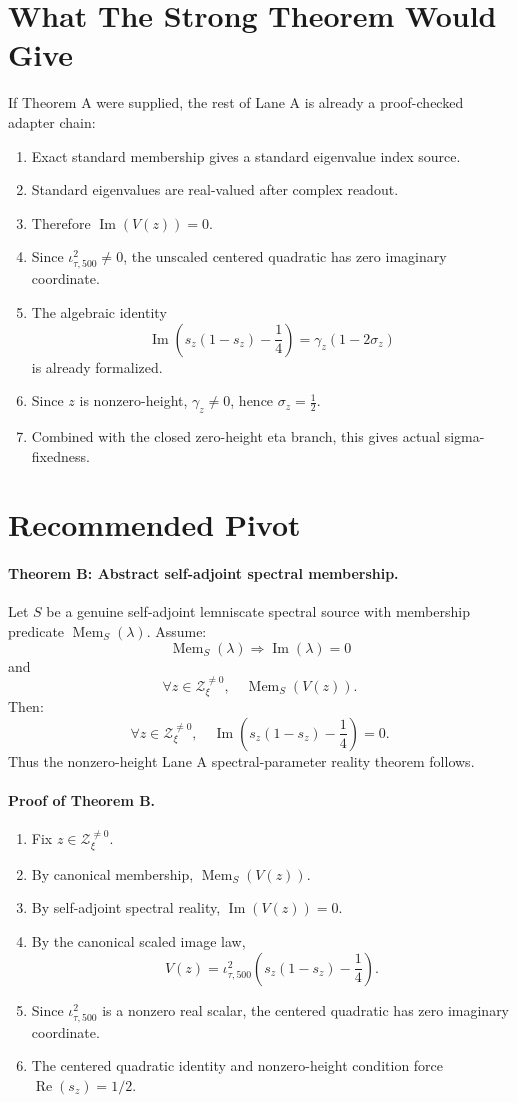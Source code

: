 \documentclass[11pt]{article}
\newcommand{\im}{\operatorname{Im}}
\newcommand{\re}{\operatorname{Re}}
\begin{document}
\section*{What The Strong Theorem Would Give}

If Theorem A were supplied, the rest of Lane A is already a proof-checked
adapter chain:
\begin{enumerate}
\item Exact standard membership gives a standard eigenvalue index source.
\item Standard eigenvalues are real-valued after complex readout.
\item Therefore \(\im(V(z))=0\).
\item Since \(\iota_{\tau,500}^2\neq0\), the unscaled centered quadratic has
  zero imaginary coordinate.
\item The algebraic identity
  \[
    \im\left(s_z(1-s_z)-\frac14\right)
    =
    \gamma_z(1-2\sigma_z)
  \]
  is already formalized.
\item Since \(z\) is nonzero-height, \(\gamma_z\neq0\), hence
  \(\sigma_z=\frac12\).
\item Combined with the closed zero-height eta branch, this gives actual
  sigma-fixedness.
\end{enumerate}

\section*{Recommended Pivot}

\paragraph{Theorem B: Abstract self-adjoint spectral membership.}
Let \(S\) be a genuine self-adjoint lemniscate spectral source with membership
predicate \(\operatorname{Mem}_S(\lambda)\).  Assume:
\[
  \operatorname{Mem}_S(\lambda)\Longrightarrow \im(\lambda)=0
\]
and
\[
  \forall z\in\mathcal Z_\xi^{\neq0},\quad \operatorname{Mem}_S(V(z)).
\]
Then:
\[
  \forall z\in\mathcal Z_\xi^{\neq0},\quad
  \im\left(s_z(1-s_z)-\frac14\right)=0.
\]
Thus the nonzero-height Lane A spectral-parameter reality theorem follows.

\paragraph{Proof of Theorem B.}
\begin{enumerate}
\item Fix \(z\in\mathcal Z_\xi^{\neq0}\).
\item By canonical membership, \(\operatorname{Mem}_S(V(z))\).
\item By self-adjoint spectral reality, \(\im(V(z))=0\).
\item By the canonical scaled image law,
  \[
    V(z)=\iota_{\tau,500}^2
    \left(s_z(1-s_z)-\frac14\right).
  \]
\item Since \(\iota_{\tau,500}^2\) is a nonzero real scalar, the centered
  quadratic has zero imaginary coordinate.
\item The centered quadratic identity and nonzero-height condition force
  \(\re(s_z)=1/2\).
\end{enumerate}
\end{document}
